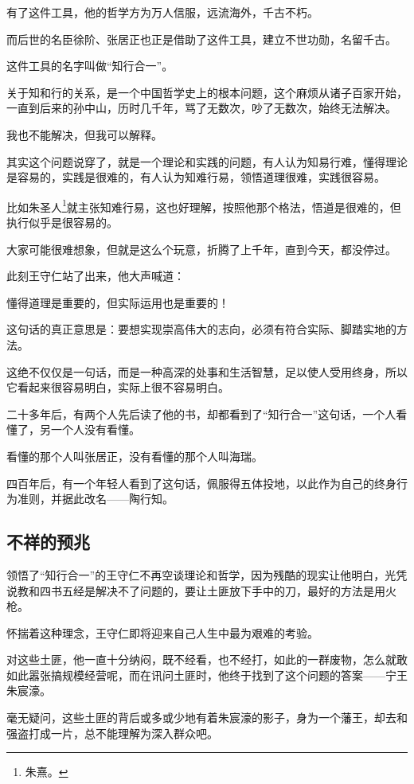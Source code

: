 \begin{multicols}{\theparacolNo}
		有了这件工具，他的哲学方为万人信服，远流海外，千古不朽。

		而后世的名臣徐阶、张居正也正是借助了这件工具，建立不世功勋，名留千古。

		这件工具的名字叫做“知行合一”。

		关于知和行的关系，是一个中国哲学史上的根本问题，这个麻烦从诸子百家开始，一直到后来的孙中山，历时几千年，骂了无数次，吵了无数次，始终无法解决。

		我也不能解决，但我可以解释。

		其实这个问题说穿了，就是一个理论和实践的问题，有人认为知易行难，懂得理论是容易的，实践是很难的，有人认为知难行易，领悟道理很难，实践很容易。

		比如朱圣人\footnote{朱熹。}就主张知难行易，这也好理解，按照他那个格法，悟道是很难的，但执行似乎是很容易的。

		大家可能很难想象，但就是这么个玩意，折腾了上千年，直到今天，都没停过。

		此刻王守仁站了出来，他大声喊道：

		懂得道理是重要的，但实际运用也是重要的！

		这句话的真正意思是：要想实现崇高伟大的志向，必须有符合实际、脚踏实地的方法。

		这绝不仅仅是一句话，而是一种高深的处事和生活智慧，足以使人受用终身，所以它看起来很容易明白，实际上很不容易明白。

		二十多年后，有两个人先后读了他的书，却都看到了“知行合一”这句话，一个人看懂了，另一个人没有看懂。

		看懂的那个人叫张居正，没有看懂的那个人叫海瑞。

		四百年后，有一个年轻人看到了这句话，佩服得五体投地，以此作为自己的终身行为准则，并据此改名——陶行知。

		\subsection{不祥的预兆}
		领悟了“知行合一”的王守仁不再空谈理论和哲学，因为残酷的现实让他明白，光凭说教和四书五经是解决不了问题的，要让土匪放下手中的刀，最好的方法是用火枪。

		怀揣着这种理念，王守仁即将迎来自己人生中最为艰难的考验。

		对这些土匪，他一直十分纳闷，既不经看，也不经打，如此的一群废物，怎么就敢如此嚣张搞规模经营呢，而在讯问土匪时，他终于找到了这个问题的答案——宁王朱宸濠。

		毫无疑问，这些土匪的背后或多或少地有着朱宸濠的影子，身为一个藩王，却去和强盗打成一片，总不能理解为深入群众吧。


\end{multicols}
